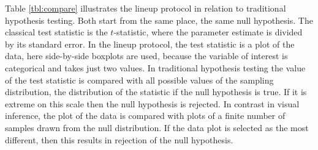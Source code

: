 \documentclass{article}
\begin{document}
Table \ref{tbl:compare} illustrates the lineup protocol in relation to traditional hypothesis testing. Both start from the same place, the same null hypothesis. The classical test statistic is the $t$-statistic, where the parameter estimate is divided by its standard error. In the lineup protocol, the test statistic is a plot of the data, here side-by-side boxplots are used, because the variable of interest is categorical and takes just two values. In traditional hypothesis testing the value of the test statistic is compared with all possible values of the sampling distribution, the distribution of the statistic if the null hypothesis is true. If it is extreme on this scale then the null hypothesis is rejected. In contrast in visual inference, the plot of the data is compared with plots of a finite number of samples drawn from the null distribution. If the data plot is selected as the most different, then this results in rejection of the null hypothesis.
\end{document}
